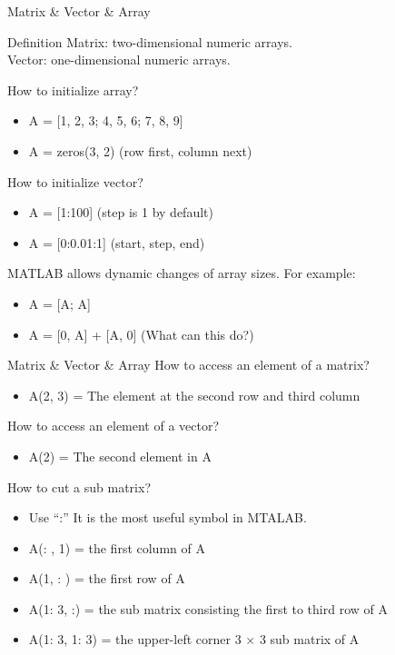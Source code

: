 \begin{frame}{Matrix \& Vector \& Array}
\begin{block}{Definition}
Matrix: two-dimensional numeric arrays.\\
Vector: one-dimensional numeric arrays.
\end{block}
How to initialize array?
\begin{itemize}
\item A = [1, 2, 3; 4, 5, 6; 7, 8, 9]
\item A = zeros(3, 2) (row first, column next)
\end{itemize}
How to initialize vector?
\begin{itemize}
\item A = [1:100] (step is 1 by default)
\item A = [0:0.01:1] (start, step, end)
\end{itemize}
MATLAB allows dynamic changes of array sizes. For example:
\begin{itemize}
\item A = [A; A]
\item A = [0, A] + [A, 0] (What can this do?)
\end{itemize}
\end{frame}

\begin{frame}{Matrix \& Vector \& Array}
How to access an element of a matrix?
\begin{itemize}
\item A(2, 3) = The element at the second row and third column
\end{itemize}
How to access an element of a vector?
\begin{itemize}
\item A(2) = The second element in A
\end{itemize}
How to cut a sub matrix?
\begin{itemize}
\item Use ``:''  It is the most useful symbol in MTALAB.
\item A(: , 1) = the first column of A
\item A(1, : ) = the first row of A
\item A(1: 3, :) = the sub matrix consisting the first to third row of A
\item A(1: 3, 1: 3) = the upper-left corner 3 $\times$ 3 sub matrix of A
\end{itemize}
\end{frame}

